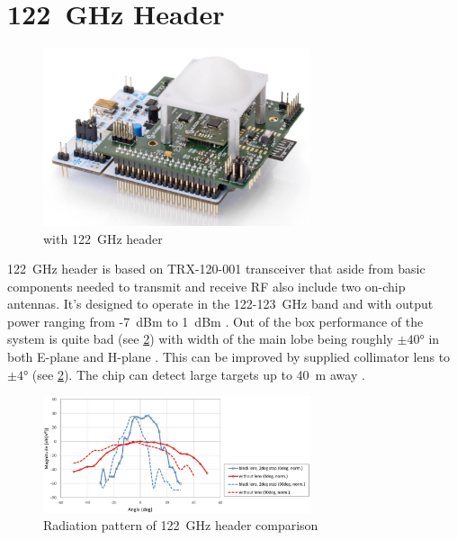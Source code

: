 \section{122~GHz Header}

\begin{figure}[h!]
	\centering
	\includegraphics[width=0.7\textwidth]{../img/sidar122.png}
	\caption[\sidar with 122~GHz header \cite{sidarPRO}]{\sidar with 122~GHz header}
	\label{fig:sidar122}
\end{figure}

122~GHz header is based on TRX-120-001 transceiver that aside from basic components needed to transmit and receive RF also include two on-chip antennas.
It's designed to operate in the 122-123~GHz band and with output power ranging from -7~dBm to 1~dBm \cite{sidarTRX122}.
Out of the box performance of the system is quite bad (see \ref{fig:sidar122rad}) with width of the main lobe being roughly $\pm40\text{°}$ in both E-plane and H-plane \cite{sidarTRX122}.
This can be improved by supplied collimator lens to $\pm4\text{°}$ \cite{sidarTRX122col} (see \ref{fig:sidar122rad}).
The chip can detect large targets up to 40~m away \cite{sidarMANOld}.


\begin{figure}[h!]
	\centering
	\includegraphics[width=0.7\textwidth]{../img/sidar122rad.jpg}
	\caption[Radiation pattern of 122~GHz header comparison \cite{sidarTRX122col}]{Radiation pattern of 122~GHz header comparison}
	\label{fig:sidar122rad}
\end{figure}


